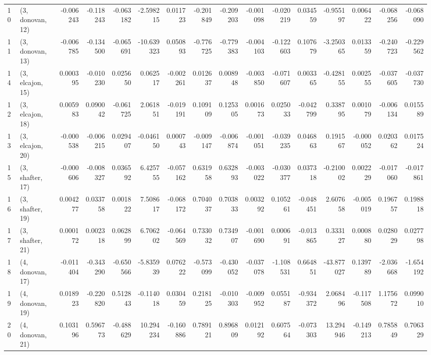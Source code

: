 \begin{tabular}{llrrrrrrrrrrrrrr}
10 &  (3, donovan, 12) &  -0.006243 & -0.118243 & -0.063182 &  -2.598215 &  0.011723 &  -0.201849 & -0.209203 & -0.001098 & -0.020219 &  0.034559 &  -0.955197 &  0.006422 & -0.068256 & -0.068090 \\
11 &  (3, donovan, 13) &  -0.006785 & -0.134500 & -0.065691 & -10.639323 &  0.050893 &  -0.776725 & -0.779383 & -0.004103 & -0.122603 &  0.107679 &  -3.250365 &  0.013359 & -0.240723 & -0.229562 \\
14 &  (3, elcajon, 15) &   0.000395 & -0.010230 &  0.025650 &   0.062517 & -0.002261 &   0.012637 &  0.008948 & -0.003850 & -0.071607 &  0.003365 &  -0.428155 &  0.002555 & -0.037605 & -0.037730 \\
12 &  (3, elcajon, 18) &   0.005983 &  0.090042 & -0.061725 &   2.061851 & -0.019191 &   0.109109 &  0.125305 &  0.001673 &  0.025033 & -0.042799 &   0.338795 &  0.001079 & -0.006134 &  0.015589 \\
13 &  (3, elcajon, 20) &  -0.000538 & -0.006215 &  0.029407 &  -0.046150 &  0.000743 &  -0.009147 & -0.006874 & -0.001051 & -0.039235 &  0.046863 &   0.191567 & -0.000052 &  0.020362 &  0.017524 \\
15 &  (3, shafter, 17) &  -0.000606 & -0.008327 &  0.036592 &   6.425755 & -0.057162 &   0.631958 &  0.632893 & -0.003022 & -0.030377 &  0.037318 &  -0.210002 &  0.002229 & -0.017060 & -0.017861 \\
16 &  (3, shafter, 19) &   0.004277 &  0.033758 &  0.001822 &   7.508617 & -0.068172 &   0.704037 &  0.703833 &  0.003292 &  0.105261 & -0.048451 &   2.607658 & -0.005019 &  0.196757 &  0.198818 \\
17 &  (3, shafter, 21) &   0.000172 &  0.002318 &  0.062899 &   6.706202 & -0.064569 &   0.733032 &  0.734907 & -0.001690 &  0.000691 & -0.013865 &   0.333127 &  0.000880 &  0.028029 &  0.027798 \\
18 &  (4, donovan, 17) &  -0.011404 & -0.343290 & -0.650566 &  -5.835939 &  0.076222 &  -0.573099 & -0.430052 & -0.037078 & -1.108531 &  0.664851 & -43.877027 &  0.139789 & -2.036668 & -1.654192 \\
19 &  (4, donovan, 19) &   0.018923 & -0.220820 &  0.512843 &  -0.114018 &  0.030459 &   0.218125 & -0.010303 & -0.009952 &  0.055187 & -0.934372 &   2.068496 & -0.117508 &  1.175672 &  0.099010 \\
20 &  (4, donovan, 21) &   0.103196 &  0.596773 & -0.488629 &  10.294234 & -0.160886 &   0.789121 &  0.896809 &  0.012192 &  0.607564 & -0.073303 &  13.294946 & -0.149213 &  0.785849 &  0.706329 \\

\end{tabular}
